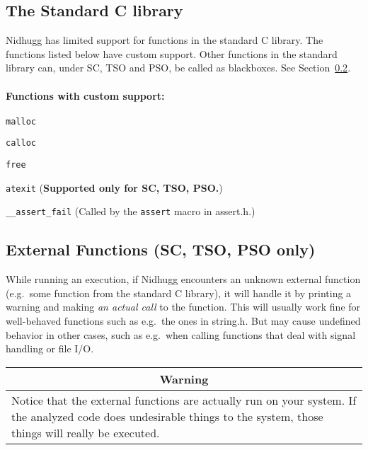\documentclass[a4paper]{article}
\newcommand{\limitsupport}[1]{\textbf{Supported only for #1.}}
\begin{document}
\subsection{The Standard C library}\label{sec:stdlibc}

Nidhugg has limited support for functions in the standard C
library. The functions listed below have custom support. Other
functions in the standard library can, under SC, TSO and PSO, be
called as blackboxes. See Section~\ref{sec:external:functions}.

\paragraph{Functions with custom support:}

\begin{description}
\item{\texttt{malloc}}
\item{\texttt{calloc}}
\item{\texttt{free}}
\item{\texttt{atexit}} (\limitsupport{SC, TSO, PSO})
\item{\texttt{\_\_assert\_fail}} (Called by the \texttt{assert} macro
  in \textsf{assert.h}.)
\end{description}

\subsection{External Functions (SC, TSO, PSO only)}\label{sec:external:functions}

While running an execution, if Nidhugg encounters an unknown external
function (e.g.\ some function from the standard C library), it will
handle it by printing a warning and making \emph{an actual call} to
the function. This will usually work fine for well-behaved functions
such as e.g.\ the ones in \textsf{string.h}. But may cause undefined
behavior in other cases, such as e.g.\ when calling functions that deal
with signal handling or file I/O.

\begin{center}
  \begin{tabular}{|p{.8\linewidth}|}
    \hline
    \multicolumn{1}{|c|}{\textbf{Warning}}\\
    \hline
    Notice that the external functions are actually run on your system. If
    the analyzed code does undesirable things to the system, those things
    will really be executed.\\
    \hline
  \end{tabular}
\end{center}
\end{document}
